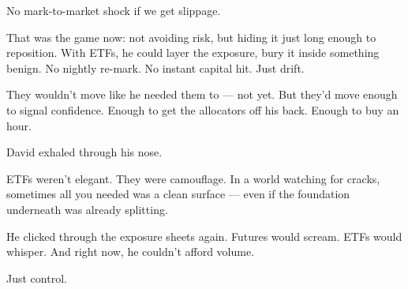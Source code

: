 \medskip

No mark-to-market shock if we get slippage.

That was the game now: not avoiding risk, but hiding it just long enough to reposition. With ETFs, he could layer the exposure, bury it inside something benign. No nightly re-mark. No instant capital hit. Just drift.

They wouldn’t move like he needed them to — not yet. But they’d move enough to signal confidence. Enough to get the allocators off his back. Enough to buy an hour.

David exhaled through his nose.

ETFs weren’t elegant. They were camouflage. In a world watching for cracks, sometimes all you needed was a clean surface — even if the foundation underneath was already splitting.

He clicked through the exposure sheets again. Futures would scream. ETFs would whisper. And right now, he couldn’t afford volume.

Just control.



\medskip

